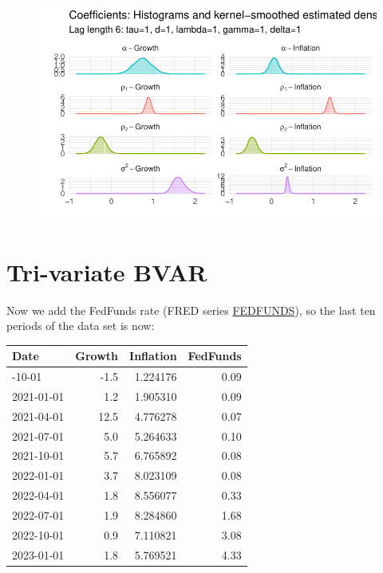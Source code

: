 \documentclass[
  letterpaper,
]{book}
\begin{document}
\begin{figure}

{\centering \includegraphics{BVAR_files/figure-pdf/unnamed-chunk-9-4.pdf}

}

\end{figure}

\hypertarget{tri-variate-bvar}{%
\section{Tri-variate BVAR}\label{tri-variate-bvar}}

Now we add the FedFunds rate (FRED series
\href{https://fred.stlouisfed.org/series/FEDFUNDS}{FEDFUNDS}), so the
last ten periods of the data set is now:

\begin{longtable}[]{@{}lrrr@{}}
\toprule\noalign{}
Date & Growth & Inflation & FedFunds \\
\midrule\noalign{}
\endhead
\bottomrule\noalign{}
\endlastfoot
2020-10-01 & -1.5 & 1.224176 & 0.09 \\
2021-01-01 & 1.2 & 1.905310 & 0.09 \\
2021-04-01 & 12.5 & 4.776278 & 0.07 \\
2021-07-01 & 5.0 & 5.264633 & 0.10 \\
2021-10-01 & 5.7 & 6.765892 & 0.08 \\
2022-01-01 & 3.7 & 8.023109 & 0.08 \\
2022-04-01 & 1.8 & 8.556077 & 0.33 \\
2022-07-01 & 1.9 & 8.284860 & 1.68 \\
2022-10-01 & 0.9 & 7.110821 & 3.08 \\
2023-01-01 & 1.8 & 5.769521 & 4.33 \\
\end{longtable}
\end{document}
